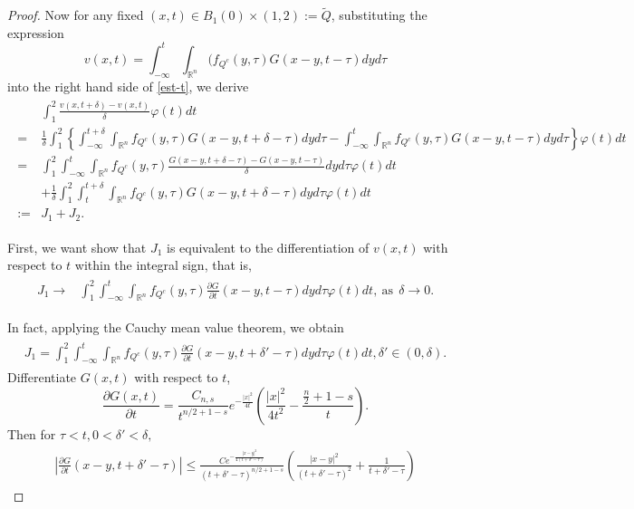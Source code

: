 \documentclass[10pt,a4paper]{amsart}
\newcommand{\R}{\mathbb{R}}
\newcommand{\mb}{\mbox}
\begin{document}
\begin{proof}
Now for any fixed $(x,t)\in B_1(0)\times(1,2):=\tilde{Q}$, substituting the expression
\begin{equation}v(x,t)=\int_{-\infty}^t \int_{\mathbb{R}^n} (f_{Q^c}(y,\tau) G(x-y, t-\tau) dy d\tau\end{equation}
into the right hand side  of \eqref{est-t}, we derive
\begin{eqnarray}\label{est-t1}
\begin{aligned}
&\int_1^2\frac{v(x,t+\delta)-v(x,t)}{\delta}\varphi(t)dt\\
=&\frac{1}{\delta}\int_1^2\left\{\int_{-\infty}^{t+\delta}\int_{\R^n}f_{Q^c}(y,\tau)G(x-y,t+\delta-\tau)dyd\tau
-\int_{-\infty}^{t}\int_{\R^n}f_{Q^c}(y,\tau)G(x-y,t-\tau)dyd\tau\right\}\varphi(t)dt\\
=&\int_1^2\int_{-\infty}^{t}\int_{\R^n}f_{Q^c}(y,\tau)\frac{G(x-y,t+\delta-\tau)-G(x-y,t-\tau)}{\delta}dyd\tau\varphi(t)dt\\
&+\frac{1}{\delta}\int_1^2\int_{t}^{t+\delta}\int_{\R^n}f_{Q^c}(y,\tau)G(x-y,t+\delta-\tau)dyd\tau\varphi(t)dt\\
:=&J_1+J_2.\end{aligned}
\end{eqnarray}

First, we want show that $J_1$  is equivalent to the differentiation of $v(x,t)$ with respect to $t$ within the integral sign, that is,
\begin{eqnarray}\label{J1-lim}
\begin{aligned}
J_1\to&\int_1^2\int_{-\infty}^{t}\int_{\R^n}f_{Q^c}(y,\tau)\frac{\partial G}{\partial t} (x-y,t-\tau)dyd\tau\varphi(t)dt, \ \mb{as}\ \ \delta\to 0.
\end{aligned}
\end{eqnarray}

 In fact, applying the Cauchy mean value theorem, we obtain
\begin{eqnarray*}
\begin{aligned}J_1=\int_1^2\int_{-\infty}^{t}\int_{\R^n}f_{Q^c}(y,\tau)\frac{\partial G}{\partial t}(x-y,t+\delta'-\tau)dyd\tau\varphi(t)dt, \delta'\in(0,\delta).\end{aligned}
\end{eqnarray*}
Differentiate $G(x,t)$ with respect to $t$,
\begin{equation}\label{grn-t}\frac{\partial G(x,t)}{\partial t}%
=\frac{C_{n,s}}{{t}^{n/2+1-s}} e^{-\frac{|x|^2}{4t}}(\frac{|x|^2}{4t^2}-\frac{\frac{n}{2}+1-s}{t}).\end{equation}
Then for $\tau<t, 0<\delta'<\delta,$
\begin{eqnarray}\label{delt}
\begin{aligned}\left|\frac{\partial G}{\partial t}(x-y,t+\delta'-\tau)\right|\leq \frac{C e^{-\frac{|x-y|^2}{4(t+\delta'-\tau)}}}{{(t+\delta'-\tau)}^{n/2+1-s}}\left(\frac{|x-y|^2}{(t+\delta'-\tau)^2}+\frac{1}{t+\delta'-\tau}\right)\end{aligned}
\end{eqnarray}


\end{proof}
\end{document}
